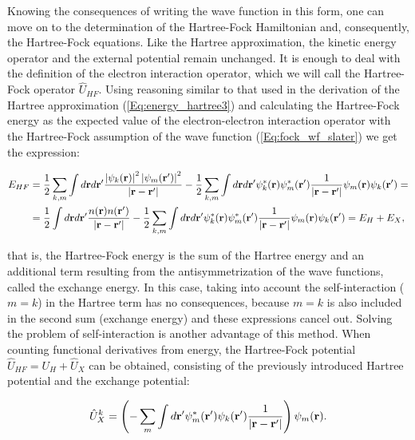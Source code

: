 Knowing the consequences of writing the wave function in this form, one can move on to the determination of the Hartree-Fock Hamiltonian and, consequently, the Hartree-Fock equations.
Like the Hartree approximation, the kinetic energy operator and the external potential remain unchanged.
It is enough to deal with the definition of the electron interaction operator, which we will call the Hartree-Fock operator $\hat{U}_{HF}$.
Using reasoning similar to that used in the derivation of the Hartree approximation (\ref{Eq:energy_hartree3}) and calculating the Hartree-Fock energy as the expected value of the electron-electron interaction operator with the Hartree-Fock assumption of the wave function (\ref{Eq:fock_wf_slater}) we get the expression:

\begin{equation}
    \begin{aligned}
        \label{Eq:energy_hf}
        E_{HF}&=\frac{1}{2}\sum_{k,m}\int d\mathbf{r}d\mathbf{r}'\frac{\left|\psi_k(\mathbf{r})\right|^2\left|\psi_m(\mathbf{r}')\right|^2}{\left|\mathbf{r}-\mathbf{r}'\right|}-\frac{1}{2}\sum_{k,m}\int d\mathbf{r}d\mathbf{r}'\psi_k^*(\mathbf{r})\psi_m^*(\mathbf{r'})\frac{1}{\left|\mathbf{r}-\mathbf{r}'\right|}\psi_m(\mathbf{r})\psi_k(\mathbf{r'})=\\
        &=\frac{1}{2}\int d\mathbf{r}d\mathbf{r}'\frac{n(\mathbf{r})n(\mathbf{r}')}{\left|\mathbf{r}-\mathbf{r}'\right|}-\frac{1}{2}\sum_{k,m}\int d\mathbf{r}d\mathbf{r}'\psi_k^*(\mathbf{r})\psi_m^*(\mathbf{r'})\frac{1}{\left|\mathbf{r}-\mathbf{r}'\right|}\psi_m(\mathbf{r})\psi_k(\mathbf{r'})=E_{H}+E_{X},
    \end{aligned}
\end{equation}

that is, the Hartree-Fock energy is the sum of the Hartree energy and an additional term resulting from the antisymmetrization of the wave functions, called the exchange energy.
In this case, taking into account the self-interaction ($m=k$) in the Hartree term has no consequences, because $m=k$ is also included in the second sum (exchange energy) and these expressions cancel out.
Solving the problem of self-interaction is another advantage of this method.
When counting functional derivatives from energy, the Hartree-Fock potential $\hat{U}_{HF}=U_H+\hat{U}_X$ can be obtained, consisting of the previously introduced Hartree potential and the exchange potential:

\begin{equation}
    \label{Eq:exchange potential}
    \hat{U}_X^k=\left(-\sum_{m}\int d\mathbf{r}'\psi_m^*(\mathbf{r'})\psi_k(\mathbf{r'})\frac{1}{\left|\mathbf{r}-\mathbf{r}'\right|}\right)\psi_m(\mathbf{r}).
\end{equation}

